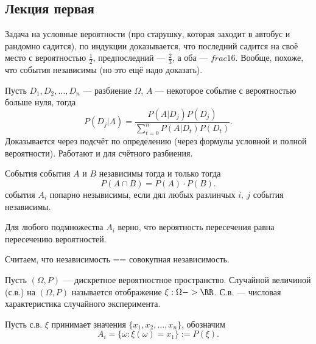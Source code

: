 \subsection{Лекция первая}

\begin{problem}
    Задача на условные вероятности (про старушку, которая заходит в автобус и рандомно садится), по индукции доказывается, что последний
    садится на своё место с вероятностью $\frac{1}{2}$, предпоследний --- $\frac{2}{3}$, а оба --- $frac{1}{6}$. Вообще, похоже, что события независимы
    (но это ещё надо доказать). 
\end{problem}

\begin{claim}
    Пусть $D_1, D_2, \ldots, D_n$ --- разбиение $\Omega$, $A$ --- некоторое событие с вероятностью больше нуля, тогда
    \[P(D_j | A) = \frac{P(A | D_j)P(D_j)}{\sum_{t=0}^n P(A | D_t)P(D_t)}.\]
    Доказывается через подсчёт по определению (через формулы условной и полной вероятности). Работают и для счётного разбиения. 
\end{claim}

\begin{definition}[Независимость]
    События события $A$ и $B$ независимы тогда и только тогда 
    \[P(A \cap B) = P(A) \cdot P(B).\]
    события $A_i$ попарно незывисимы, если дял любых разлинчых $i,\ j$ события независимы.
\end{definition}

\begin{definition}
    Для любого подмножества $A_i$ верно, что вероятность пересечения равна пересечению вероятностей.
\end{definition}

\begin{remark}
    Считаем, что независимость == совокупная независимость. 
\end{remark}

\begin{definition}
    Пусть $(\Omega, P)$ --- дискретное вероятностное пространство. Случайной величиной (с.в.) на $(\Omega, P)$ называется отображение $\xi: \Omega -> \RR$.
    С.в. --- числовая характеристика случайного эксперимента.
\end{definition}

\begin{definition}
    Пусть с.в. $\xi$ принимает значения $\{x_1, x_2, \ldots, x_n\}$, обозначим 
    \[A_i = \{\omega : \xi(\omega) = x_1\} := P(\xi).\]
\end{definition}